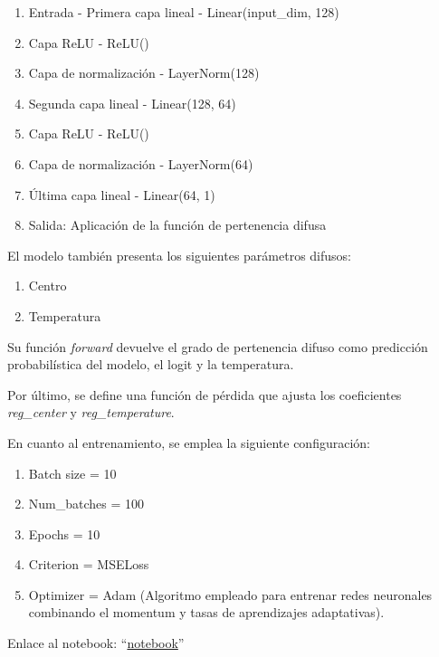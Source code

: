 \begin{enumerate}
 \item Entrada - Primera capa lineal - Linear(input\_dim, 128)
 \item Capa ReLU - ReLU()
 \item Capa de normalización - LayerNorm(128)
 \item Segunda capa lineal - Linear(128, 64)
 \item Capa ReLU - ReLU()
 \item Capa de normalización - LayerNorm(64)
 \item Última capa lineal - Linear(64, 1)
 \item Salida: Aplicación de la función de pertenencia difusa
\end{enumerate}

El modelo también presenta los siguientes parámetros difusos:

\begin{enumerate}
 \item Centro
 \item Temperatura
\end{enumerate}

Su función \textit{forward} devuelve el grado de pertenencia difuso como predicción probabilística del modelo, el logit y la temperatura.

Por último, se define una función de pérdida que ajusta los coeficientes \textit{reg\_center} y \textit{reg\_temperature}.

En cuanto al entrenamiento, se emplea la siguiente configuración:

\begin{enumerate}
 \item Batch size = 10
 \item Num\_batches = 100
 \item Epochs = 10
 \item Criterion = MSELoss
 \item Optimizer = Adam (Algoritmo empleado para entrenar redes neuronales combinando el momentum y tasas de aprendizajes adaptativas).
\end{enumerate}

Enlace al notebook: ``\href{https://github.com/NILGroup/tfg-2526-xplicavoz/blob/main/Modelos/Iván/MLP.ipynb}{notebook}''